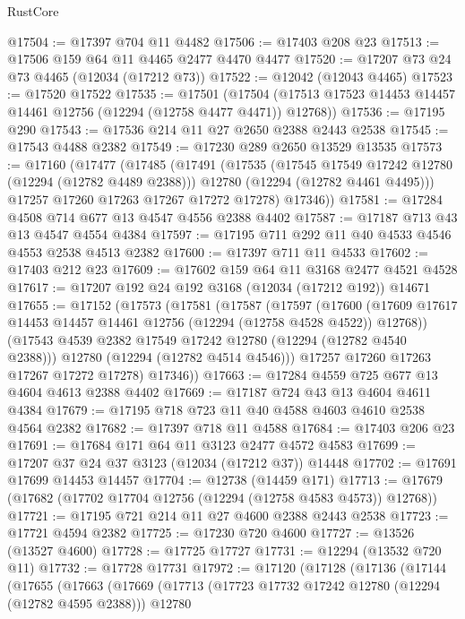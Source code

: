 \begin{lexlean}{RustCore}
\begin{coremodule}
@17504 := @17397 @704 @11 @4482
@17506 := @17403 @208 @23
@17513 := @17506 @159 @64 @11 @4465 @2477 @4470 @4477
@17520 := @17207 @73 @24 @73 @4465 (@12034 (@17212 @73))
@17522 := @12042 (@12043 @4465)
@17523 := @17520 @17522
@17535 := @17501
    (@17504 (@17513 @17523 @14453 @14457 @14461 @12756 (@12294 (@12758 @4477 @4471)) @12768))
@17536 := @17195 @290
@17543 := @17536 @214 @11 @27 @2650 @2388 @2443 @2538
@17545 := @17543 @4488 @2382
@17549 := @17230 @289 @2650 @13529 @13535
@17573 := @17160
    (@17477
      (@17485
        (@17491
          (@17535
            (@17545 @17549 @17242 @12780 (@12294 (@12782 @4489 @2388)))
            @12780
            (@12294 (@12782 @4461 @4495)))
          @17257
          @17260
          @17263
          @17267
          @17272
          @17278)
        @17346))
@17581 := @17284 @4508 @714 @677 @13 @4547 @4556 @2388 @4402
@17587 := @17187 @713 @43 @13 @4547 @4554 @4384
@17597 := @17195 @711 @292 @11 @40 @4533 @4546 @4553 @2538 @4513 @2382
@17600 := @17397 @711 @11 @4533
@17602 := @17403 @212 @23
@17609 := @17602 @159 @64 @11 @3168 @2477 @4521 @4528
@17617 := @17207 @192 @24 @192 @3168 (@12034 (@17212 @192)) @14671
@17655 := @17152
    (@17573
      (@17581
        (@17587
          (@17597
            (@17600
              (@17609 @17617 @14453 @14457 @14461 @12756 (@12294 (@12758 @4528 @4522)) @12768))
            (@17543 @4539 @2382 @17549 @17242 @12780 (@12294 (@12782 @4540 @2388)))
            @12780
            (@12294 (@12782 @4514 @4546)))
          @17257
          @17260
          @17263
          @17267
          @17272
          @17278)
        @17346))
@17663 := @17284 @4559 @725 @677 @13 @4604 @4613 @2388 @4402
@17669 := @17187 @724 @43 @13 @4604 @4611 @4384
@17679 := @17195 @718 @723 @11 @40 @4588 @4603 @4610 @2538 @4564 @2382
@17682 := @17397 @718 @11 @4588
@17684 := @17403 @206 @23
@17691 := @17684 @171 @64 @11 @3123 @2477 @4572 @4583
@17699 := @17207 @37 @24 @37 @3123 (@12034 (@17212 @37)) @14448
@17702 := @17691 @17699 @14453 @14457
@17704 := @12738 (@14459 @171)
@17713 := @17679 (@17682 (@17702 @17704 @12756 (@12294 (@12758 @4583 @4573)) @12768))
@17721 := @17195 @721 @214 @11 @27 @4600 @2388 @2443 @2538
@17723 := @17721 @4594 @2382
@17725 := @17230 @720 @4600
@17727 := @13526 (@13527 @4600)
@17728 := @17725 @17727
@17731 := @12294 (@13532 @720 @11)
@17732 := @17728 @17731
@17972 := @17120
    (@17128
      (@17136
        (@17144
          (@17655
            (@17663
              (@17669
                (@17713
                  (@17723 @17732 @17242 @12780 (@12294 (@12782 @4595 @2388)))
                  @12780

\end{coremodule}
\end{lexlean}
